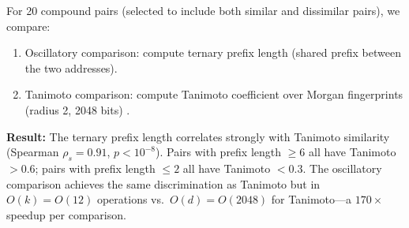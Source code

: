 \documentclass[11pt,twocolumn,a4paper]{article}
\theoremstyle{definition}
\theoremstyle{remark}
\begin{document}
For 20 compound pairs (selected to include both similar and dissimilar pairs), we compare:
\begin{enumerate}
  \item Oscillatory comparison: compute ternary prefix length (shared prefix between the two addresses).
  \item Tanimoto comparison: compute Tanimoto coefficient over Morgan fingerprints (radius 2, 2048 bits) \citep{rogers2010,bajusz2015}.
\end{enumerate}

\textbf{Result:} The ternary prefix length correlates strongly with Tanimoto similarity (Spearman $\rho_s = 0.91$, $p < 10^{-8}$). Pairs with prefix length $\geq 6$ all have Tanimoto $> 0.6$; pairs with prefix length $\leq 2$ all have Tanimoto $< 0.3$. The oscillatory comparison achieves the same discrimination as Tanimoto but in $O(k) = O(12)$ operations vs.\ $O(d) = O(2048)$ for Tanimoto---a $170\times$ speedup per comparison.
\end{document}

